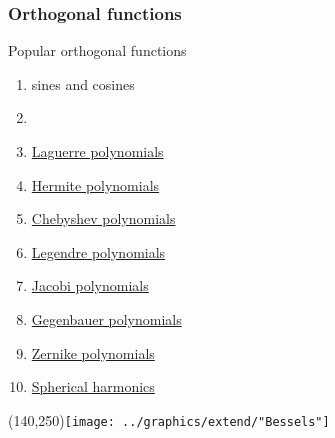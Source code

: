 \documentclass[handout]{beamer}
\begin{document}
\begin{frame}      %
\frametitle{Orthogonal functions}
  Popular orthogonal functions
  \begin{enumerate}
    \item sines and cosines
    \item \href{http://mathworld.wolfram.com/BesselFunction.html}{}
    \item \href{http://mathworld.wolfram.com/LaguerrePolynomial.html}{Laguerre polynomials}
    \item \href{http://mathworld.wolfram.com/HermitePolynomial.html}{Hermite polynomials}
    \item \href{http://mathworld.wolfram.com/ChebyshevPolynomialoftheFirstKind.html}{Chebyshev polynomials}
    \item \href{http://mathworld.wolfram.com/LegendrePolynomial.html}{Legendre polynomials}
    \item \href{http://mathworld.wolfram.com/JacobiPolynomial.html}{Jacobi polynomials}
    \item \href{http://mathworld.wolfram.com/GegenbauerPolynomial.html}{Gegenbauer polynomials}
    \item \href{http://mathworld.wolfram.com/ZernikePolynomial.html}{Zernike polynomials}
    \item \href{http://mathworld.wolfram.com/SphericalHarmonic.html}{Spherical harmonics}
  \end{enumerate}
    \Put(140,250){\texttt{[image: ../graphics/extend/"Bessels"]}}
\end{frame}
\end{document}
